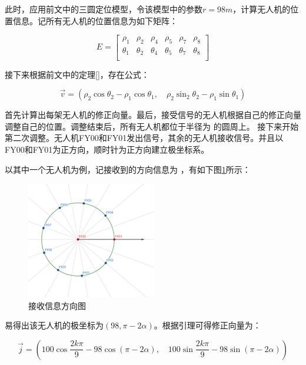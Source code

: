 此时，应用前文中的三圆定位模型，令该模型中的参数$r=98m$，计算无人机的位置信息。记所有无人机的位置信息为如下矩阵：

\begin{equation}
    E = \left[
        \begin{matrix}
            \rho_1 &\rho_2 &\rho_4 &\rho_5 &\rho_7 &\rho_8 \\
            \theta_1 &\theta_2 &\theta_4 &\theta_5 &\theta_7 &\theta_8 \\
        \end{matrix}
    \right]
\end{equation}

接下来根据前文中的定理\ref{}，存在公式：

\begin{equation}
    \overrightarrow{v} = (\rho_2\cos\theta_2 - \rho_1\cos\theta_1, \quad\rho_2\sin_2\theta_2 - \rho_1\sin\theta_1)
\end{equation}

首先计算出每架无人机的修正向量。最后，接受信号的无人机根据自己的修正向量调整自己的位置。调整结束后，所有无人机都位于半径为 的圆周上。
接下来开始第二次调整。无人机FY00和FY01发出信号，其余的无人机接收信号。并且以FY00和FY01为正方向，顺时针为正方向建立极坐标系。

以其中一个无人机为例，记接收到的方向信息为 ，有如下图\ref{figure112026}所示：

\begin{figure}[h]
    \centering
    \includegraphics[scale=0.8]{res/figure112026.png}
    \caption{接收信息方向图}
    \label{figure112026}
\end{figure}

易得出该无人机的极坐标为$(98, \pi-2\alpha)$。根据引理可得修正向量为：

\begin{equation}
    \overrightarrow{j} = \left(100\cos\frac{2k\pi}{9} - 98\cos(\pi-2\alpha), \quad 100\sin\frac{2k\pi}{9} - 98\sin(\pi - 2\alpha)\right)
\end{equation}


